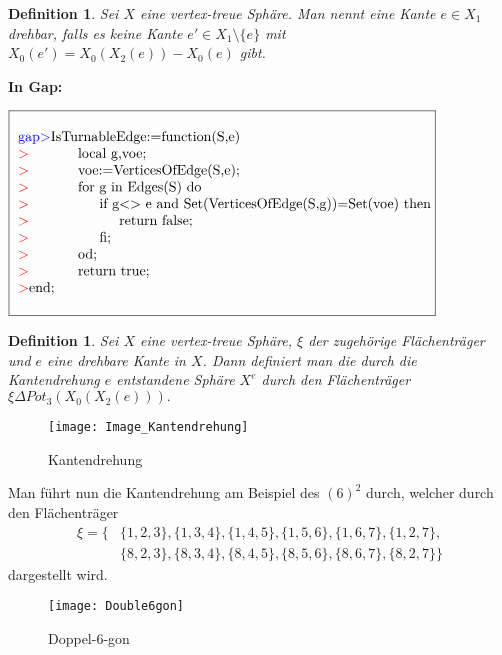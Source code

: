 \documentclass[12pt,titlepage,twoside,cleardoublepage]{article}
\theoremstyle{nummermitklammern}
\newtheorem{definition}[temp]{Definition}
\newtheorem{definition}[zahl]{Definition}
\numberwithin{equation}{section}
\begin{document}
\begin{definition}
Sei $X$ eine vertex-treue Sphäre. Man nennt eine Kante $e\in X_1$ \emph{drehbar}, falls es keine Kante $e'\in X_1\setminus \{e\}$ mit $X_0(e')=X_0(X_2(e))-X_0(e)$ gibt.
\end{definition}
\textbf{In Gap:}
\begin{center}
$\fbox{
\parbox{14cm}{
\begin{tabbing}
\textcolor{blue}{gap$>$}IsTu\=rnableEdge:=function(S,e)\\
\textcolor{red}{$>$}\> local g,voe;\\
\textcolor{red}{$>$}\> voe:=VerticesOfEdge(S,e);\\
\textcolor{red}{$>$}\> for \=g in Edges(S) do\\
\textcolor{red}{$>$}\>\> if g\=$<>$ e and Set(VerticesOfEdge(S,g))=Set(voe) then\\
\textcolor{red}{$>$}\>\>\> return false;\\
\textcolor{red}{$>$}\>\> fi;\\
\textcolor{red}{$>$}\> od;\\
\textcolor{red}{$>$}\> return true;\\
\textcolor{red}{$>$}end;
\end{tabbing}
}}$
\end{center}
\begin{definition}
Sei $X$ eine vertex-treue Sphäre, $\xi$ der zugehörige Flächenträger und $e$ eine drehbare Kante in $X$. Dann definiert man die durch die Kantendrehung $e$ entstandene Sphäre $X^e$ durch den Flächenträger $\xi \Delta Pot_3(X_0(X_2(e))).$
\end{definition}
\begin{figure}[H]
\begin{center}
\texttt{[image: Image\_Kantendrehung]}
\end{center}
\caption{Kantendrehung}
\end{figure}
 Man führt nun die Kantendrehung am Beispiel des $(6)^2$  durch, welcher durch den Flächenträger
\begin{align*}
\xi=\{&\{1,2,3\},\{1,3,4\},\{1,4,5\},\{1,5,6\},\{1,6,7\},\{1,2,7\},\\ 
&\{8,2,3\},\{8,3,4\},\{8,4,5\},\{8,5,6\},\{8,6,7\},\{8,2,7\}\}
\end{align*}
dargestellt wird. 
\begin{figure}[H]
\begin{center}
\texttt{[image: Double6gon]}
\end{center}
\caption{Doppel-6-gon }
\end{figure}
\end{document}
